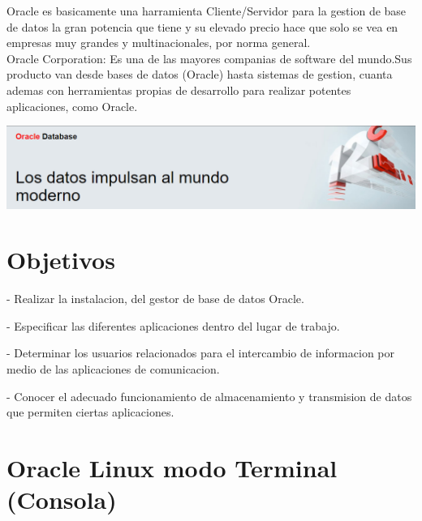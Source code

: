 \documentclass[12pt,letterpaper]{article}
\begin{document}
Oracle es basicamente una harramienta Cliente/Servidor para la gestion de base de datos la gran potencia que tiene y su elevado precio hace que solo se vea en empresas muy grandes y multinacionales, por norma general. \\
Oracle Corporation: Es una de las mayores companias de software del mundo.Sus producto van desde bases de datos (Oracle) hasta sistemas de gestion, cuanta ademas con herramientas propias de desarrollo para realizar potentes aplicaciones, como Oracle. 
\begin{center}
\includegraphics[width=15cm]{IMG/img001.png} 
\end{center}

 \newpage
\section{Objetivos} 
- Realizar la instalacion,  del gestor de base de datos Oracle.

- Especificar las diferentes aplicaciones dentro del lugar de trabajo.

- Determinar los usuarios relacionados para el intercambio de informacion por medio de las aplicaciones de comunicacion.

- Conocer el adecuado funcionamiento de almacenamiento y transmision de datos que permiten ciertas aplicaciones.
\newpage
\section{Oracle Linux modo Terminal (Consola)}
\end{document}
